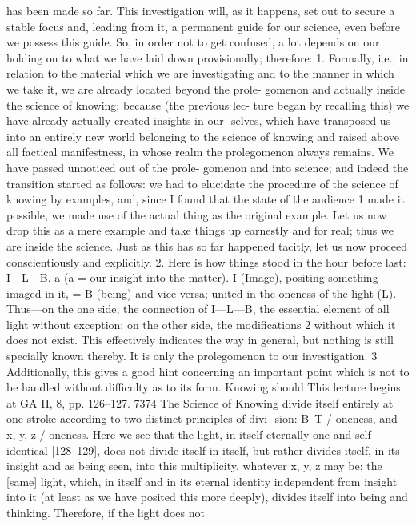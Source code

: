 has been made so far. This investigation will, as it happens, set out to secure a
stable focus and, leading from it, a permanent guide for our science, even
before we possess this guide. So, in order not to get confused, a lot depends
on our holding on to what we have laid down provisionally; therefore:
1. Formally, i.e., in relation to the material which we are investigating and
to the manner in which we take it, we are already located beyond the prole-
gomenon and actually inside the science of knowing; because (the previous lec-
ture began by recalling this) we have already actually created insights in our-
selves, which have transposed us into an entirely new world belonging to the
science of knowing and raised above all factical manifestness, in whose realm the
prolegomenon always remains. We have passed unnoticed out of the prole-
gomenon and into science; and indeed the transition started as follows: we had
to elucidate the procedure of the science of knowing by examples, and, since I
found that the state of the audience 1 made it possible, we made use of the actual
thing as the original example. Let us now drop this as a mere example and take
things up earnestly and for real; thus we are inside the science. Just as this has
so far happened tacitly, let us now proceed conscientiously and explicitly.
2. Here is how things stood in the hour before last: I—L—B. a (a = our
insight into the matter). I (Image), positing something imaged in it, = B
(being) and vice versa; united in the oneness of the light (L). Thus—on the
one side, the connection of I—L—B, the essential element of all light without
exception: on the other side, the modifications 2 without which it does not exist.
This effectively indicates the way in general, but nothing is still specially
known thereby. It is only the prolegomenon to our investigation. 3
Additionally, this gives a good hint concerning an important point
which is not to be handled without difficulty as to its form. Knowing should
This lecture begins at GA II, 8, pp. 126–127.
7374
The Science of Knowing
divide itself entirely at one stroke according to two distinct principles of divi-
sion: B–T / oneness, and x, y, z / oneness. Here we see that the light, in itself
eternally one and self-identical [128–129], does not divide itself in itself, but
rather divides itself, in its insight and as being seen, into this multiplicity,
whatever x, y, z may be; the [same] light, which, in itself and in its eternal
identity independent from insight into it (at least as we have posited this more
deeply), divides itself into being and thinking. Therefore, if the light does not
